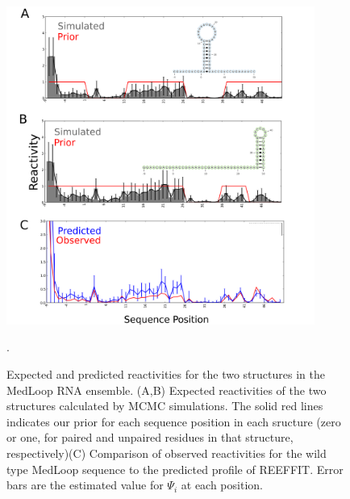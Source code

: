\documentclass[12pt]{article}
\begin{document}
\begin{figure}[here]
\includegraphics[width=0.9\textwidth]{figures/medlooppredicted.png}
\caption{Expected and predicted reactivities for the two structures in the MedLoop RNA ensemble. (A,B) Expected reactivities of the two structures calculated by MCMC simulations. The solid red lines indicates our prior for each sequence position in each sructure (zero or one, for paired and unpaired residues in that structure, respectively)(C)  Comparison of observed reactivities for the wild type MedLoop sequence to the predicted profile of REEFFIT. Error bars are the estimated value for $\Psi_i$ at each position.}.
\label{fig:medlooppredictedfig}
\end{figure}

\end{document}
